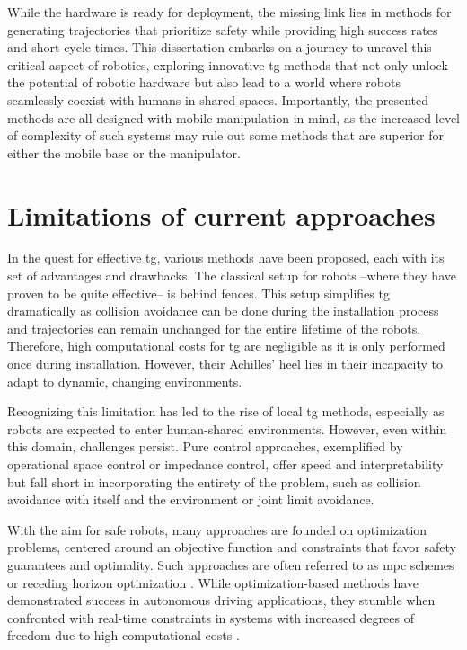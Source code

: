 While the hardware is ready for deployment, the
missing link lies in methods for generating trajectories
that prioritize safety while providing high success rates
and short cycle times.
This dissertation embarks on a journey to unravel this
critical aspect of robotics, exploring innovative \ac{tg}
methods that not only unlock the potential of
robotic hardware but also lead to a world where robots
seamlessly coexist with humans in shared spaces.
Importantly, the presented methods are all designed with
mobile manipulation in mind, as the increased level of
complexity of such systems may rule out some methods that
are superior for either the mobile base or the manipulator.

\section{Limitations of current approaches}
\label{sec:limitations_of_current_approaches}

In the quest for effective \ac{tg}, various
methods have been proposed, each with its set of advantages and
drawbacks.
The classical setup for robots --where they have
proven to be quite effective-- is behind fences. This setup
simplifies \ac{tg} dramatically as collision
avoidance can be done during the installation process and
trajectories can remain unchanged for the entire lifetime of
the robots. Therefore, high computational costs for
\ac{tg} are negligible as it is only performed
once during installation. However, their Achilles' heel lies
in their incapacity to adapt to dynamic, changing
environments.

Recognizing this limitation has led to the rise of local
\ac{tg} methods, especially as robots are
expected to enter human-shared environments. However, even
within this domain, challenges persist. Pure control
approaches, exemplified by operational space control or
impedance control, offer speed and interpretability but fall
short in incorporating the entirety of the problem, such as
collision avoidance with itself and the environment or
joint limit avoidance.

With the aim for safe robots, many approaches are
founded on optimization problems, centered around an
objective function and constraints that favor safety
guarantees and optimality. Such approaches are often
referred to as \ac{mpc} schemes or receding
horizon optimization \cite{hewing2020learning}. While
optimization-based methods have demonstrated success in
autonomous driving applications, they stumble when
confronted with real-time constraints in systems with
increased degrees of freedom due to high computational costs
\cite{spahn2021coupled}.

